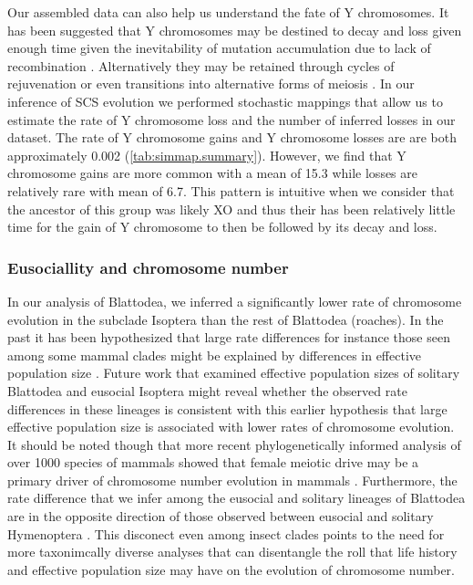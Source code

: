 Our assembled data can also help us understand the fate of Y chromosomes. 
It has been suggested that Y chromosomes may be destined to decay and loss given enough time given the inevitability of mutation accumulation due to lack of recombination \citep{steinemann2005}.
Alternatively they may be retained through cycles of rejuvenation or even transitions into alternative forms of meiosis \citep{blackmon2015bioessay}.
In our inference of SCS evolution we performed stochastic mappings that allow us to estimate the rate of Y chromosome loss and the number of inferred losses in our dataset.
The rate of Y chromosome gains and Y chromosome losses are are both approximately 0.002 (\cref{tab:simmap.summary}). 
However, we find that Y chromosome gains are more common with a mean of 15.3 while losses are relatively rare with mean of 6.7.
This pattern is intuitive when we consider that the ancestor of this group was likely XO and thus their has been relatively little time for the gain of Y chromosome to then be followed by its decay and loss.

\subsubsection{Eusociallity and chromosome number}
In our analysis of Blattodea, we inferred a significantly lower rate of chromosome evolution in the subclade Isoptera than the rest of Blattodea (roaches).
In the past it has been hypothesized that large rate differences for instance those seen among some mammal clades might be explained by differences in effective population size \citep{bush1977rapid}.
Future work that examined effective population sizes of solitary Blattodea and eusocial Isoptera might reveal whether the observed rate differences in these lineages is consistent with this earlier hypothesis that large effective population size is associated with lower rates of chromosome evolution.
It should be noted though that more recent phylogenetically informed analysis of over 1000 species of mammals showed that female meiotic drive may be a primary driver of chromosome number evolution in mammals \citep{blackmon2019meiotic}.
Furthermore, the rate difference that we infer among the eusocial and solitary lineages of Blattodea are in the opposite direction of those observed between eusocial and solitary Hymenoptera \citep{ross2015}.
This disconect even among insect clades points to the need for more taxonimcally diverse analyses that can disentangle the roll that life history and effective population size may have on the evolution of chromosome number.

